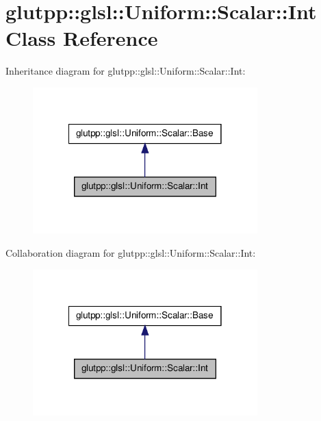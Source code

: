 \hypertarget{classglutpp_1_1glsl_1_1Uniform_1_1Scalar_1_1Int}{\section{glutpp\-:\-:glsl\-:\-:\-Uniform\-:\-:\-Scalar\-:\-:\-Int \-Class \-Reference}
\label{classglutpp_1_1glsl_1_1Uniform_1_1Scalar_1_1Int}
}


\-Inheritance diagram for glutpp\-:\-:glsl\-:\-:\-Uniform\-:\-:\-Scalar\-:\-:\-Int\-:\nopagebreak
\begin{figure}[H]
\begin{center}
\leavevmode
\includegraphics[width=246pt]{classglutpp_1_1glsl_1_1Uniform_1_1Scalar_1_1Int__inherit__graph}
\end{center}
\end{figure}


\-Collaboration diagram for glutpp\-:\-:glsl\-:\-:\-Uniform\-:\-:\-Scalar\-:\-:\-Int\-:\nopagebreak
\begin{figure}[H]
\begin{center}
\leavevmode
\includegraphics[width=246pt]{classglutpp_1_1glsl_1_1Uniform_1_1Scalar_1_1Int__coll__graph}
\end{center}
\end{figure}
